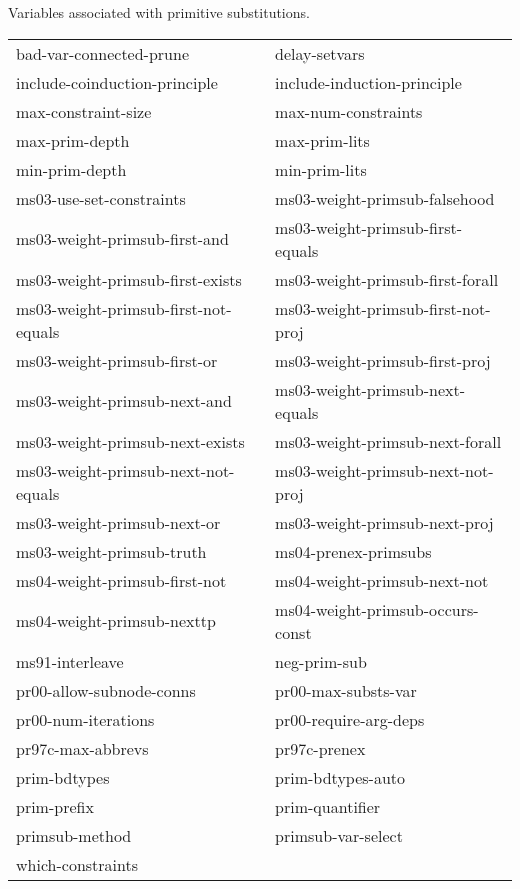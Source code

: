 \begin{description} 
\item[PRIMSUBS]  
Variables associated with primitive substitutions.

\begin{tabular}{l l}
bad-var-connected-prune&delay-setvars\\
include-coinduction-principle&include-induction-principle\\
max-constraint-size&max-num-constraints\\
max-prim-depth&max-prim-lits\\
min-prim-depth&min-prim-lits\\
ms03-use-set-constraints&ms03-weight-primsub-falsehood\\
ms03-weight-primsub-first-and&ms03-weight-primsub-first-equals\\
ms03-weight-primsub-first-exists&ms03-weight-primsub-first-forall\\
ms03-weight-primsub-first-not-equals&ms03-weight-primsub-first-not-proj\\
ms03-weight-primsub-first-or&ms03-weight-primsub-first-proj\\
ms03-weight-primsub-next-and&ms03-weight-primsub-next-equals\\
ms03-weight-primsub-next-exists&ms03-weight-primsub-next-forall\\
ms03-weight-primsub-next-not-equals&ms03-weight-primsub-next-not-proj\\
ms03-weight-primsub-next-or&ms03-weight-primsub-next-proj\\
ms03-weight-primsub-truth&ms04-prenex-primsubs\\
ms04-weight-primsub-first-not&ms04-weight-primsub-next-not\\
ms04-weight-primsub-nexttp&ms04-weight-primsub-occurs-const\\
ms91-interleave&neg-prim-sub\\
pr00-allow-subnode-conns&pr00-max-substs-var\\
pr00-num-iterations&pr00-require-arg-deps\\
pr97c-max-abbrevs&pr97c-prenex\\
prim-bdtypes&prim-bdtypes-auto\\
prim-prefix&prim-quantifier\\
primsub-method&primsub-var-select\\
which-constraints
\end{tabular}
\item
\end{description}

